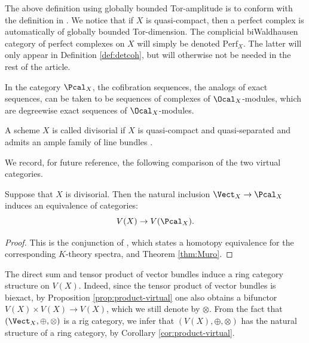 The above definition using globally bounded Tor-amplitude is to conform with the definition in \cite[Def.\,3.1]{ThomasonTrobaugh}. We notice that if $X$ is quasi-compact, then a perfect complex is automatically of globally bounded Tor-dimension. The complicial biWaldhausen category of perfect complexes on $X$ will simply be denoted $\mathrm{Perf}_{X}$. The latter will only appear in Definition \ref{def:detcoh}, but will otherwise not be needed in the rest of the article.

In the category $\Pcal_X$, the cofibration sequences, \ie the analogs of exact sequences, can be taken to be sequences of complexes of $\Ocal_X$-modules, which are degreewise exact sequences of $\Ocal_X$-modules.

\begin{definition}\label{def:divisorial}
A scheme $X$ is called divisorial if $X$ is quasi-compact and quasi-separated and admits an ample family of line bundles \cite[Exp.\,II, Déf.\,2.2.4]{SGA6}.
\end{definition}

We record, for future reference, the following comparison of the two virtual categories.
\begin{lemma}\label{lemma:divisorial}
Suppose that $X$ is divisorial. Then the natural inclusion $\Vect_X \to \Pcal_X$ induces an equivalence of categories:
\begin{displaymath}
V(X) \to V(\Pcal_X).
\end{displaymath}
\end{lemma}
\begin{proof}
This is the conjunction of \cite[Cor.\,3.9 \& Prop.\,3.10]{ThomasonTrobaugh}, which states a homotopy equivalence for the corresponding $K$-theory spectra, and Theorem \ref{thm:Muro}.
\end{proof}

The direct sum and tensor product of vector bundles induce a ring category structure on $V(X)$. Indeed, since the tensor product of vector bundles is biexact, by Proposition \ref{prop:product-virtual} one also obtains a bifunctor $V(X) \times V(X)\to V(X)$, which we still denote by $\otimes$. From the fact that $(\Vect_{X},\oplus,\otimes)$ is a rig category, we infer that $(V(X),\oplus,\otimes)$ has the natural structure of a ring category, by Corollary \ref{cor:product-virtual}.

